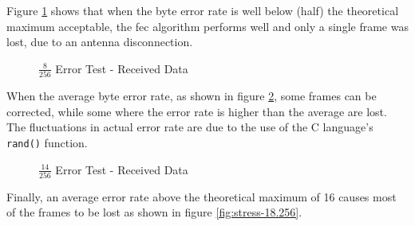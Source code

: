 Figure \ref{fig:stress-8.256} shows that when the byte error rate is well below
(half) the theoretical maximum acceptable, the \acrshort{fec} algorithm performs
well and only a single frame was lost, due to an antenna disconnection.

\begin{figure}[h]
\centering
\caption{$\frac{8}{256}$ Error Test - Received Data}
\label{fig:stress-8.256}
\end{figure}

When the average byte error rate, as shown in figure \ref{fig:stress-14.256},
some frames can be corrected, while some where the error rate is higher than
the average are lost. The fluctuations in actual error rate are due to the use
of the C language's \texttt{rand()} function. %

\begin{figure}[h]
\centering
\caption{$\frac{14}{256}$ Error Test - Received Data}
\label{fig:stress-14.256}
\end{figure}

Finally, an average error rate above the theoretical maximum of \SI{16}{\byte}
causes most of the frames to be lost as shown in figure \ref{fig:stress-18.256}.

